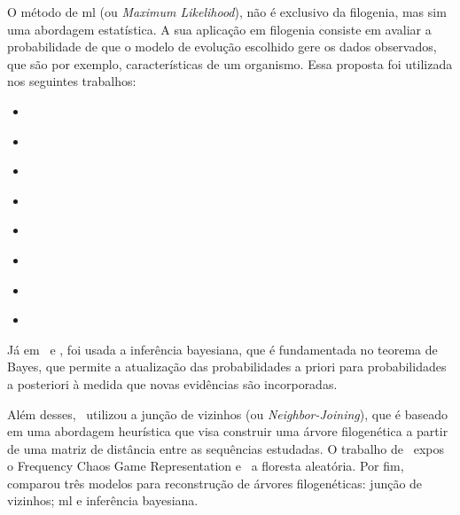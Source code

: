 O método de \gls{ml} (ou \textit{Maximum Likelihood}), não é exclusivo da filogenia, mas sim uma abordagem estatística. A sua aplicação em filogenia consiste em avaliar a probabilidade de que o modelo de evolução escolhido gere os dados observados, que são por exemplo, características de um organismo. Essa proposta foi utilizada nos seguintes trabalhos:
\begin{itemize}
  \item \citeauthor{behl_threat_2022}
  \item \citeauthor{fall_genetic_diversity_2021}
  \item \citeauthor{shabbir_comprehensive_2020}
  \item \citeauthor{hudu_hepatitis_2018}
  \item \citeauthor{sallard_tracing_2021}
  \item \citeauthor{paez-espino_diversity_evolution_2019}
  \item \citeauthor{tang_evolutionary_2021}
  \item \citeauthor{cho_analysis_2022}
\end{itemize}

Já em~\textit{} e \textit{}, foi usada a inferência bayesiana, que é fundamentada no teorema de Bayes, que permite a atualização das probabilidades a priori para probabilidades a posteriori à medida que novas evidências são incorporadas.

Além desses,~\citeauthor{potdar_phylogenetic_2021} utilizou a junção de vizinhos (ou \textit{Neighbor-Joining}), que é baseado em uma abordagem heurística que visa construir uma árvore filogenética a partir de uma matriz de distância entre as sequências estudadas. O trabalho de~\citeauthor{lichtblau_alignment-free_2019} expos o Frequency Chaos Game Representation e~\citeauthor{kim_ngs_2022} a floresta aleatória. Por fim,~\citeauthor{dimitrov_updated_2019} comparou três modelos para reconstrução de árvores filogenéticas: junção de vizinhos; \gls{ml} e inferência bayesiana.